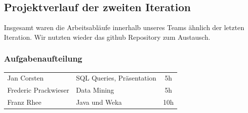 \documentclass[
10pt,
a4paper
]{scrartcl}
\begin{document}
\subsection{Projektverlauf der zweiten Iteration}
Insgesamt waren die Arbeitsabläufe innerhalb unseres Teams ähnlich der letzten Iteration. Wir nutzten wieder das github Repository zum Austausch.


 

\subsubsection{Aufgabenaufteilung}
\begin{tabular}{ l l c }
Jan Corsten & SQL Queries, Präsentation & 5h \\
Frederic Prackwieser & Data Mining & 5h \\
Franz Rhee & Java und Weka & 10h \\
\end{tabular}
\end{document}
